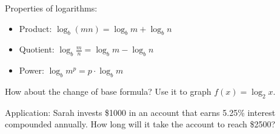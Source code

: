 \documentclass[11pt]{article}
\begin{document}
    \vspace{2ex}

    \noindent Properties of logarithms:

    \begin{itemize}
        \item Product: $\displaystyle \log_b(mn) = \log_b m + \log_b n$
        \item Quotient: $\displaystyle \log_b \frac{m}{n} = \log_b m - \log_b n$
        \item Power: $\displaystyle \log_b m^p = p \cdot \log_b m$
    \end{itemize}

    \vspace{2ex}

    \noindent How about the change of base formula? Use it to graph $\displaystyle f(x) = \log_2 x$.

    \emptygraph

    \noindent Application: Sarah invests \$1000 in an account that earns 5.25\% interest compounded annually. How long will it take the account to reach \$2500?
\end{document}
